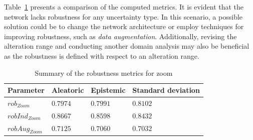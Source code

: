 Table~\ref{table:rob_zo} presents a comparison of the computed metrics. It is evident that the network lacks robustness for any uncertainty type. In this scenario, a possible solution could be to change the network architecture or employ techniques for improving robustness, such as \textit{data augmentation}. Additionally, revising the alteration range and conducting another domain analysis may also be beneficial as the robustness is defined with respect to an alteration range.

\begin{table}[h]
	\centering
	\begin{tabular}{|| l | l | l | l ||} 
		\hline
		\textbf{Parameter} & \textbf{Aleatoric} & \textbf{Epistemic} & \textbf{Standard deviation} \\
		\hline
		\hline
		$rob_{Zoom}$ & $0.7974$ & $0.7991$ & $0.8102$ \\
		$robInd_{Zoom}$ & $0.8667$ & $0.8598$ & $0.8432$ \\
		$robAug_{Zoom}$ & $0.7125$ & $0.7060$ & $0.7032$ \\	
		\hline
	\end{tabular}	
	\caption{Summary of the robustness metrics for zoom}
	\label{table:rob_zo}
\end{table}